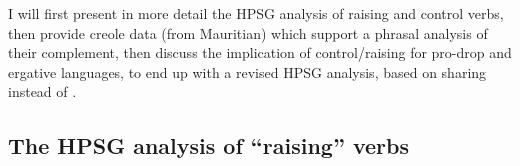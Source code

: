 I will first present in more detail the HPSG analysis of raising and
control verbs, then provide creole data (from Mauritian) which support a phrasal analysis of their
complement, then discuss the implication of control/raising for pro-drop and ergative languages, to end up
with a revised HPSG analysis, based on sharing \xarg instead of \subj. 

\subsection{The HPSG analysis of ``raising'' verbs}
\label{control:sec-HPSG-anaylsis-of-raising}

